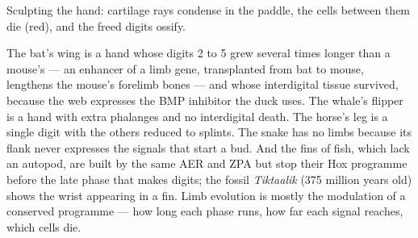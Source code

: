 \begin{omfigure}

{\small Sculpting the hand: cartilage rays condense in the paddle,
the cells between them die (red), and the freed digits ossify.}
\end{omfigure}

\begin{example}\label{ex:b2:limb-organogenesis:evolution}
The bat's wing is a hand whose digits 2 to 5 grew several times
longer than a mouse's --- an enhancer of a limb gene, transplanted
from bat to mouse, lengthens the mouse's forelimb bones --- and
whose interdigital tissue survived, because the web expresses the
BMP inhibitor the duck uses. The whale's flipper is a hand with
extra phalanges and no interdigital death. The horse's leg is a
single digit with the others reduced to splints. The snake has no
limbs because its flank never expresses the signals that start a
bud. And the fins of fish, which lack an autopod, are built by the
same AER and ZPA but stop their Hox programme before the late phase
that makes digits; the fossil \emph{Tiktaalik} (375 million years
old) shows the wrist appearing in a fin. Limb evolution is mostly
the modulation of a conserved programme --- how long each phase
runs, how far each signal reaches, which cells die.
\end{example}

